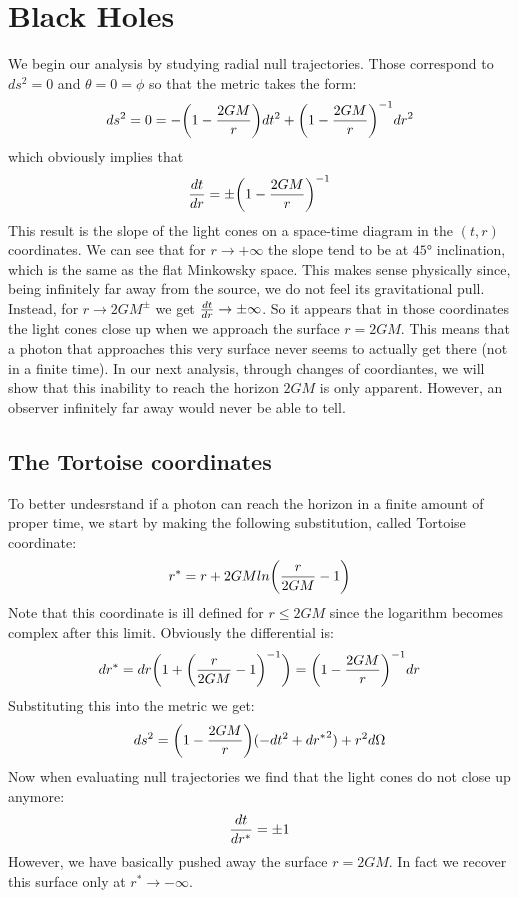 \documentclass[]{article}
\theoremstyle{definition}
\theoremstyle{Theorem}
\theoremstyle{definition}
\theoremstyle{definition}
\theoremstyle{definition}
\begin{document}
\section{Black Holes}
We begin our analysis by studying radial null trajectories. Those correspond to $ds^2=0$ and $\theta=0=\phi$ so that the metric takes the form:
$$ds^2=0=-\bigg(1-{2GM\over r}\bigg)dt^2+\bigg(1-{2GM\over r}\bigg)^{-1}dr^2$$ 
which obviously implies that
$${dt\over dr}=\pm \bigg(1-{2GM\over r}\bigg)^{-1}$$
This result is the slope of the light cones on a space-time diagram in the $(t,r)$ coordinates. We can see that for $r\rightarrow+\infty$ the slope tend to be at $45°$ inclination, which is the same as the flat Minkowsky space. This makes sense physically since, being infinitely far away from the source, we do not feel its gravitational pull. Instead, for $r\rightarrow 2GM^\pm$ we get ${dt\over dr}\rightarrow\pm\infty$. So it appears that in those coordinates the light cones close up when we approach the surface $r=2GM$. This means that a photon that approaches this very surface never seems to actually get there (not in a finite time). In our next analysis, through changes of coordiantes, we will show that this inability to reach the horizon $2GM$ is only apparent. However, an observer infinitely far away would never be able to tell.
\subsection{The Tortoise coordinates}
To better undesrstand if a photon can reach the horizon in a finite amount of proper time, we start by making the following substitution, called Tortoise coordinate:
$$r^*=r+2GMln\bigg({r\over 2GM}-1\bigg)$$
Note that this coordinate is ill defined for $r\leq2GM$ since the logarithm becomes complex after this limit.
Obviously the differential is:
$$dr^*=dr\bigg(1+\bigg({r\over 2GM}-1\bigg)^{-1}\bigg)=\bigg(1-{2GM\over r}\bigg)^{-1}dr$$
Substituting this into the metric we get:
$$ds^2=\bigg(1-{2GM\over r}\bigg)(-dt^2+{dr^*}^2)+r^2d\Omega$$
Now when evaluating null trajectories we find that the light cones do not close up anymore:
$${dt\over {dr^*}}=\pm1$$
However, we have basically pushed away the surface $r=2GM$. In fact we recover this surface only at $r^*\rightarrow -\infty$.
\end{document}

